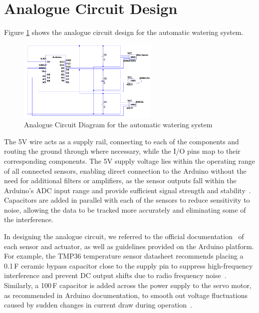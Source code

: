 \documentclass[a4paper,11pt]{article}
\begin{document}
\section{Analogue Circuit Design}
\label{sec:Analogue_Circuit_Design}

Figure \ref{fig:Analogue_Circuit_Diagram_for_the_automatic_watering_system}
shows the analogue circuit design for the automatic watering system.

\begin{figure}[H]
    \centering
    \includegraphics[width=0.6\textwidth]{Analogue Circuit Diagram.png}
    \caption{Analogue Circuit Diagram for the automatic watering system}
    \label{fig:Analogue_Circuit_Diagram_for_the_automatic_watering_system}
\end{figure}

The 5V wire acts as a supply rail, connecting to each of the components and routing the ground through where necessary, while the I/O pins map to their corresponding components. 
The 5V supply voltage lies within the operating range of all connected sensors, enabling direct connection to the Arduino without the need for additional filters or amplifiers, 
as the sensor outputs fall within the Arduino’s ADC input range and provide sufficient signal strength and stability~\cite{arduino}.
Capacitors are added in parallel with each of the sensors to reduce sensitivity to noise, allowing the data to be tracked more accurately and eliminating some of the interference.

In designing the analogue circuit, we referred to the official documentation~\cite{dfrobot,arduino,tmp36} of each sensor and actuator, as well as guidelines provided on the Arduino platform. 
For example, the TMP36 temperature sensor datasheet recommends placing a 0.1\,\textmu F ceramic bypass capacitor close to the supply pin to suppress high-frequency interference and prevent DC output shifts due to radio frequency noise~\cite{tmp36}. 
Similarly, a 100\,\textmu F capacitor is added across the power supply to the servo motor, as recommended in Arduino documentation, to smooth out voltage fluctuations caused by sudden changes in current draw during operation~\cite{arduino}.
\end{document}
